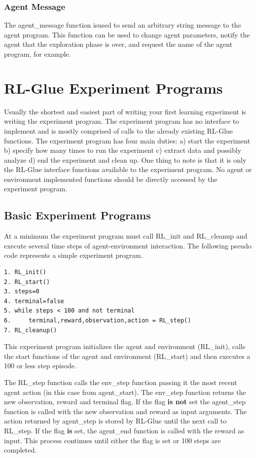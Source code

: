 \documentclass[11pt]{article}
\begin{document}
\subsubsection{Agent Message}
The agent\_message function isused to send an arbitrary string message to the agent program. This function can be used to change agent parameters, notify the agent that the exploration phase is over, and request the name of the agent program, for example.



\section{RL-Glue Experiment Programs}
\label{exp}
Usually the shortest and easiest part of writing your first learning experiment is writing the experiment program. The experiment program has no interface to implement and is mostly comprised of calls to the already existing RL-Glue functions. The experiment program has four main duties: a) start the experiment b) specify how many times to run the experiment c) extract data and possibly analyze d) end the experiment and clean up.  One thing to note is that it is only the RL-Glue interface functions available to the experiment program. No agent or environment implemented functions should be directly accessed by the experiment program.

\subsection{Basic Experiment Programs}
\label{expp1}

At a minimum the experiment program must call RL\_init and RL\_cleanup and execute several time steps of agent-environment interaction. The following pseudo code represents a simple experiment program.
\begin{verbatim}
1. RL_init()
2. RL_start()
3. steps=0
4. terminal=false 
5. while steps < 100 and not terminal
6.     terminal,reward,observation,action = RL_step()
7. RL_cleanup()
\end{verbatim}
This experiment program initializes the agent and environment (RL\_init), calls the start functions of the agent and environment (RL\_start) and then executes a 100 or less step episode. 

The RL\_step function calls the env\_step function passing it the most recent agent action (in this case from agent\_start). The env\_step function returns the new observation, reward and terminal flag. If the flag {\bf is not} set the agent\_step function is called with the new observation and reward as input arguments. The action returned by agent\_step is stored by RL-Glue until the next call to RL\_step. If the flag {\bf is} set, the agent\_end function is called with the reward as input. This process continues until either the flag is set or 100 steps are completed. 
\end{document}
